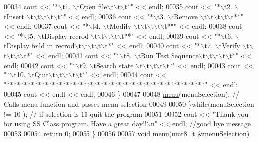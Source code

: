 \begin{DoxyCode}
00034             cout << \textcolor{stringliteral}{"*\(\backslash\)t1. \(\backslash\)tOpen file\(\backslash\)t\(\backslash\)t\(\backslash\)t*"} << endl;
00035             cout << \textcolor{stringliteral}{"*\(\backslash\)t2. \(\backslash\)tInsert  \(\backslash\)t\(\backslash\)t\(\backslash\)t\(\backslash\)t\(\backslash\)t*"} << endl;
00036             cout << \textcolor{stringliteral}{"*\(\backslash\)t3. \(\backslash\)tRemove \(\backslash\)t\(\backslash\)t\(\backslash\)t\(\backslash\)t\(\backslash\)t**"} << endl;
00037             cout << \textcolor{stringliteral}{"*\(\backslash\)t4. \(\backslash\)tModify \(\backslash\)t\(\backslash\)t\(\backslash\)t\(\backslash\)t\(\backslash\)t**"} << endl;
00038             cout << \textcolor{stringliteral}{"*\(\backslash\)t5. \(\backslash\)tDisplay recrod \(\backslash\)t\(\backslash\)t\(\backslash\)t\(\backslash\)t\(\backslash\)t**"} << endl;
00039             cout << \textcolor{stringliteral}{"*\(\backslash\)t6. \(\backslash\)tDisplay feild in recrod\(\backslash\)t\(\backslash\)t\(\backslash\)t\(\backslash\)t\(\backslash\)t*"} << endl;
00040             cout << \textcolor{stringliteral}{"*\(\backslash\)t7. \(\backslash\)tVerify \(\backslash\)t\(\backslash\)t\(\backslash\)t\(\backslash\)t\(\backslash\)t*"} << endl;
00041             cout << \textcolor{stringliteral}{"*\(\backslash\)t8. \(\backslash\)tRun Test Sequence\(\backslash\)t\(\backslash\)t\(\backslash\)t\(\backslash\)t\(\backslash\)t*"} << endl;
00042             cout << \textcolor{stringliteral}{"*\(\backslash\)t9. \(\backslash\)tSearch state \(\backslash\)t\(\backslash\)t\(\backslash\)t\(\backslash\)t\(\backslash\)t*"} << endl;
00043             cout << \textcolor{stringliteral}{"*\(\backslash\)t10. \(\backslash\)tQuit\(\backslash\)t\(\backslash\)t\(\backslash\)t\(\backslash\)t\(\backslash\)t*"} << endl;         
00044             cout << \textcolor{stringliteral}{"*********************************************************"} << endl;
00045             cout << endl << endl;
00046         \}
00047         
00048         \hyperlink{TestDocument_8cpp_a23e4bdfe8835d4c21bff59dfd73e05f5}{menu}(menuSelection);    \textcolor{comment}{// Calls menu function and passes menu selection}
00049 
00050     \}\textcolor{keywordflow}{while}(menuSelection != 10 );   \textcolor{comment}{// if selection is 10 quit the program}
00051 
00052     cout << \textcolor{stringliteral}{"Thank you for using SS Class program. Have a great day!!\(\backslash\)n"} << endl;   \textcolor{comment}{//good bye message}
00053 
00054     \textcolor{keywordflow}{return} 0;
00055 \}
00056 
\hyperlink{TestDocument_8cpp_a23e4bdfe8835d4c21bff59dfd73e05f5}{00057} \textcolor{keywordtype}{void} \hyperlink{TestDocument_8cpp_a23e4bdfe8835d4c21bff59dfd73e05f5}{menu}(uint8\_t &menuSelection)

\end{DoxyCode}
